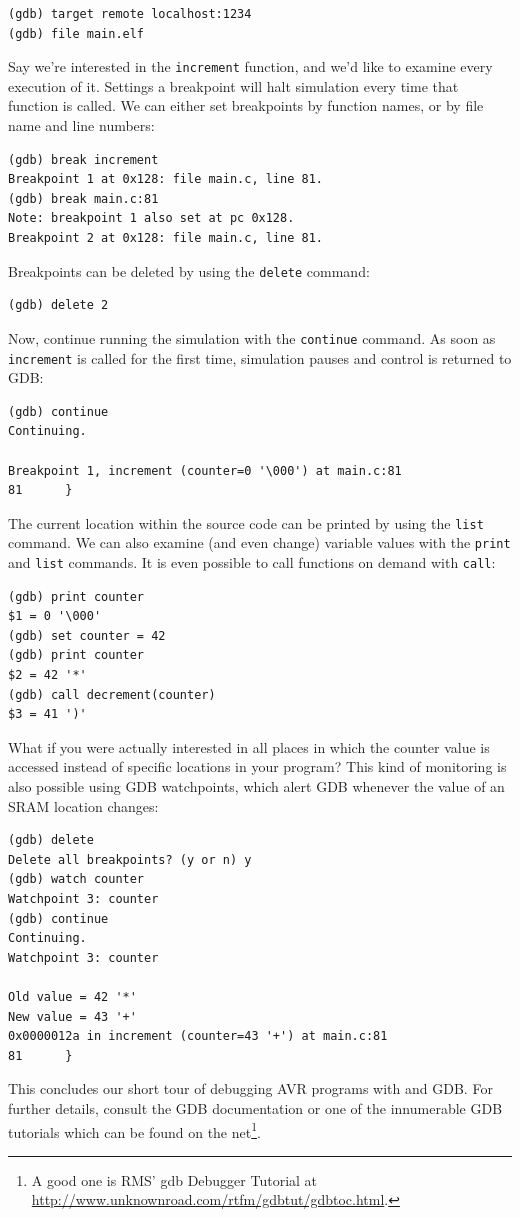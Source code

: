 \begin{verbatim}
(gdb) target remote localhost:1234
(gdb) file main.elf
\end{verbatim}

Say we're interested in the \lstinline|increment| function, and we'd like to
examine every execution of it. Settings a breakpoint will halt simulation
every time that function is called. We can either set breakpoints by
function names, or by file name and line numbers:

\begin{verbatim}
(gdb) break increment
Breakpoint 1 at 0x128: file main.c, line 81.
(gdb) break main.c:81
Note: breakpoint 1 also set at pc 0x128.
Breakpoint 2 at 0x128: file main.c, line 81.
\end{verbatim}

Breakpoints can be deleted by using the \verb|delete| command:

\begin{verbatim}
(gdb) delete 2
\end{verbatim}

Now, continue running the simulation with the \verb|continue| command.
As soon as \lstinline|increment| is called for the first time,
simulation pauses and control is returned to \ac{GDB}:

\begin{verbatim}
(gdb) continue
Continuing.

Breakpoint 1, increment (counter=0 '\000') at main.c:81
81      }
\end{verbatim}

The current location within the source code can be printed by using the \verb|list|
command. We can also examine (and even change) variable values with the \verb|print|
and \verb|list| commands. It is even possible to call functions on demand with
\verb|call|:

\begin{verbatim}
(gdb) print counter
$1 = 0 '\000'
(gdb) set counter = 42
(gdb) print counter
$2 = 42 '*'
(gdb) call decrement(counter)
$3 = 41 ')'
\end{verbatim}

What if you were actually interested in all places in which the counter value
is accessed instead of specific locations in your program? This kind of monitoring
is also possible using \ac{GDB} watchpoints, which alert \ac{GDB} whenever the
value of an \ac{SRAM} location changes:

\begin{verbatim}
(gdb) delete
Delete all breakpoints? (y or n) y
(gdb) watch counter
Watchpoint 3: counter
(gdb) continue
Continuing.
Watchpoint 3: counter

Old value = 42 '*'
New value = 43 '+'
0x0000012a in increment (counter=43 '+') at main.c:81
81      }
\end{verbatim}

This concludes our short tour of debugging \ac{AVR} programs with \qsimavr and
\ac{GDB}. For further details, consult the \ac{GDB} documentation \cite{gdb} or
one of the innumerable \ac{GDB} tutorials which can be found on the net\footnote{
%
A good one is RMS' gdb Debugger Tutorial at \url{http://www.unknownroad.com/rtfm/gdbtut/gdbtoc.html}.
%
}.
